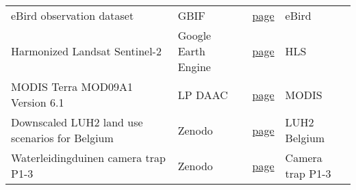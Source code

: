 \begin{table}
\begin{tabular}{llll}
eBird observation dataset & GBIF & \href{https://www.gbif.org/dataset/4fa7b334-ce0d-4e88-aaae-2e0c138d049e}{page} & eBird \\
Harmonized Landsat Sentinel-2 & Google Earth Engine & \href{https://developers.google.com/earth-engine/datasets/catalog/NASA_HLS_HLSS30_v002}{page} & HLS \\
MODIS Terra MOD09A1 Version 6.1 & LP DAAC & \href{https://lpdaac.usgs.gov/products/mod09a1v061/}{page} & MODIS \\
Downscaled LUH2 land use scenarios for Belgium & Zenodo & \href{https://zenodo.org/records/8319440}{page} & LUH2 Belgium \\
Waterleidingduinen camera trap P1-3 & Zenodo & \href{https://zenodo.org/records/11440456}{page} & Camera trap P1-3 \\
\bottomrule
\end{tabular}
\end{table}

